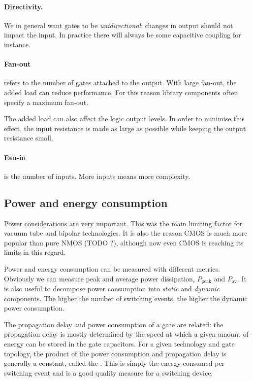 \documentclass{report}
\begin{document}
\paragraph{Directivity.} We in general want gates to be \textit{unidirectional}: changes in output should not impact the input. In practice there will always be some capacitive coupling for instance.
\paragraph{Fan-out} refers to the number of gates attached to the output. With large fan-out, the added load can reduce performance. For this reason library components often specify a maximum fan-out.

The added load can also affect the logic output levels. In order to minimise this effect, the input resistance is made as large as possible while keeping the output resistance small.

\paragraph{Fan-in} is the number of inputs. More inputs means more complexity.

\subsection{Power and energy consumption}
Power considerations are very important. This was the main limiting factor for vacuum tube and bipolar technologies. It is also the reason CMOS is much more popular than pure NMOS (TODO ?), although now even CMOS is reaching its limits in this regard.

Power and energy consumption can be measured with different metrics. Obviously we can measure peak and average power dissipation, $P_\text{peak}$ and $P_\text{av}$. It is also useful to decompose power consumption into \textit{static} and \textit{dynamic} components. The higher the number of switching events, the higher the dynamic power consumption.

The propagation delay and power consumption of a gate are related: the propagation delay is mostly determined by the speed at which a given amount of energy can be stored in the gate capacitors. For a given technology and gate topology, the product of the power consumption and propagation delay is generally a constant, called the . This is simply the energy consumed per switching event and is a good quality measure for a switching device.
\end{document}
